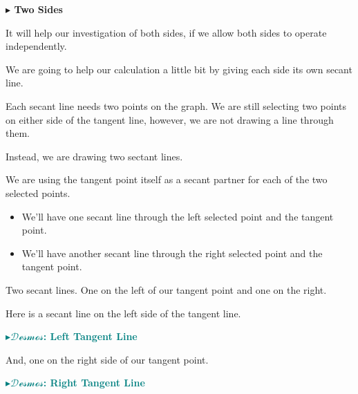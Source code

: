 \documentclass{ximera}
\begin{document}
\textbf{\textcolor{red!70!black}{$\blacktriangleright$ Two Sides}}

It will help our investigation of both sides, if we allow both sides to operate independently. 


We are going to help our calculation a little bit by giving each side its own secant line.  



Each secant line needs two points on the graph. We are still selecting two points on either side of the tangent line, however, we are not drawing a line through them.

Instead, we are drawing two sectant lines.

We are using the tangent point itself as a secant partner for each of the two selected points.


\begin{itemize}
\item We'll have one secant line through the left selected point and the tangent point.
\item We'll have another secant line through the right selected point and the tangent point.
\end{itemize}

Two secant lines. One on the left of our tangent point and one on the right.



Here is a secant line on the left side of the tangent line.



\begin{onlineOnly}
\textbf{\textcolor{teal}{$\blacktriangleright \mathcal{Desmos}$: Left Tangent Line}} 
\begin{center}
\end{center}
\end{onlineOnly}




And, one on the right side of our tangent point.


\begin{onlineOnly}
\textbf{\textcolor{teal}{$\blacktriangleright \mathcal{Desmos}$: Right Tangent Line}} 
\begin{center}
\end{center}
\end{onlineOnly}
\end{document}
